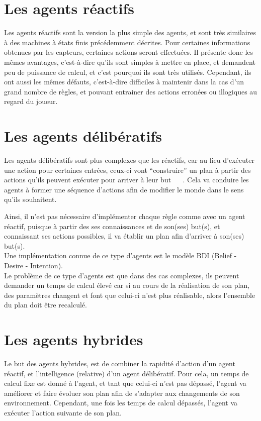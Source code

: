 \documentclass[asi]{picINSAIA}
\begin{document}
\section{Les agents réactifs}
Les agents réactifs sont la version la plus simple des agents, et sont très similaires à des machines à états finis précédemment décrites. Pour certaines informations obtenues par les capteurs, certaines actions seront effectuées. Il présente donc les mêmes avantages, c'est-à-dire qu'ils sont simples à mettre en place, et demandent peu de puissance de calcul, et c'est pourquoi ils sont très utilisés.
Cependant, ils ont aussi les mêmes défauts, c'est-à-dire difficiles à maintenir dans la cas d'un grand nombre de règles, et pouvant entrainer des actions erronées ou illogiques au regard du joueur.

\section{Les agents délibératifs}
Les agents délibératifs sont plus complexes que les réactifs, car au lieu d'exécuter une action pour certaines entrées, ceux-ci vont ``construire'' un plan à partir des actions qu'ils peuvent exécuter pour arriver à leur but ~\cite{IntelAgents4CompGames} ~\cite{IntelAgentsInCompGames}. Cela va conduire les agents à former une séquence d'actions afin de modifier le monde dans le sens qu'ils souhaitent.

Ainsi, il n'est pas nécessaire d'implémenter chaque règle comme avec un agent réactif, puisque à partir des ses connaissances et de son(ses) but(s), et connaissant ses actions possibles, il va établir un plan afin d'arriver à son(ses) but(s).\\
Une implémentation connue de ce type d'agents est le modèle BDI (Belief - Desire - Intention).\\
Le problème de ce type d'agents est que dans des cas complexes, ils peuvent demander un temps de calcul élevé car si au cours de la réalisation de son plan, des paramètres changent et font que celui-ci n'est plus réalisable, alors l'ensemble du plan doit être recalculé.

\section{Les agents hybrides}
Le but des agents hybrides, est de combiner la rapidité d'action d'un agent réactif, et l'intelligence (relative) d'un agent délibératif.
Pour cela, un temps de calcul fixe est donné à l'agent, et tant que celui-ci n'est pas dépassé, l'agent va améliorer et faire évoluer son plan afin de s'adapter aux changements de son environnement. Cependant, une fois les temps de calcul dépassés, l'agent va exécuter l'action suivante de son plan.
\end{document}
